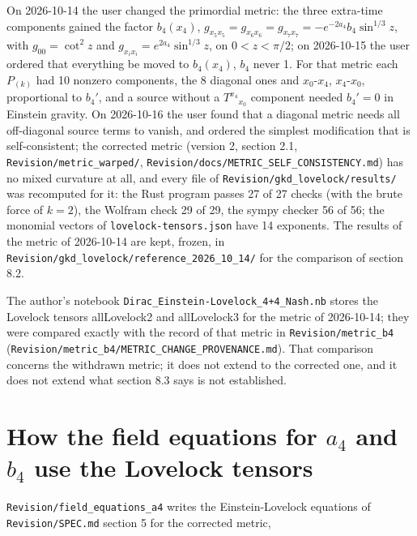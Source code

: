 \documentclass[11pt]{article}
\begin{document}
On 2026-10-14 the user changed the primordial metric: the three extra-time components gained the factor $b_4(x_4)$, $g_{x_5x_5} = g_{x_6x_6} = g_{x_7x_7} = -e^{-2a_4}b_4\sin^{1/3}z$, with $g_{00} = \cot^2z$ and $g_{x_ix_i} = e^{2a_4}\sin^{1/3}z$, on $0 < z < \pi/2$; on 2026-10-15 the user ordered that everything be moved to $b_4(x_4)$, $b_4$ never 1. For that metric each $P_{(k)}$ had 10 nonzero components, the 8 diagonal ones and $x_0$-$x_4$, $x_4$-$x_0$, proportional to $b_4'$, and a source without a $T^{x_4}{}_{x_0}$ component needed $b_4' = 0$ in Einstein gravity. On 2026-10-16 the user found that a diagonal metric needs all off-diagonal source terms to vanish, and ordered the simplest modification that is self-consistent; the corrected metric (version 2, section 2.1, \texttt{Revision\allowbreak{}/metric\_\allowbreak{}warped/}, \texttt{Revision\allowbreak{}/docs/ME\allowbreak{}TRIC\_SEL\allowbreak{}F\_CONSIS\allowbreak{}TENCY.md}) has no mixed curvature at all, and every file of \texttt{Revision\allowbreak{}/gkd\_lov\allowbreak{}elock/re\allowbreak{}sults/} was recomputed for it: the Rust program passes 27 of 27 checks (with the brute force of $k = 2$), the Wolfram check 29 of 29, the sympy checker 56 of 56; the monomial vectors of \texttt{lovelock\allowbreak{}-tensors\allowbreak{}.json} have 14 exponents. The results of the metric of 2026-10-14 are kept, frozen, in \texttt{Revision\allowbreak{}/gkd\_lov\allowbreak{}elock/re\allowbreak{}ference\_\allowbreak{}2026\_10\_\allowbreak{}14/} for the comparison of section 8.2.

The author's notebook \texttt{Dirac\_Ei\allowbreak{}nstein-L\allowbreak{}ovelock\_\allowbreak{}4+4\_Nash\allowbreak{}.nb} stores the Lovelock tensors allLovelock2 and allLovelock3 for the metric of 2026-10-14; they were compared exactly with the record of that metric in \texttt{Revision\allowbreak{}/metric\_\allowbreak{}b4} (\texttt{Revision\allowbreak{}/metric\_\allowbreak{}b4/METRI\allowbreak{}C\_CHANGE\allowbreak{}\_PROVENA\allowbreak{}NCE.md}). That comparison concerns the withdrawn metric; it does not extend to the corrected one, and it does not extend what section 8.3 says is not established.

\section{How the field equations for \texorpdfstring{$a_4$}{a\_4} and \texorpdfstring{$b_4$}{b\_4} use the Lovelock tensors}

\texttt{Revision\allowbreak{}/field\_e\allowbreak{}quations\allowbreak{}\_a4} writes the Einstein-Lovelock equations of \texttt{Revision\allowbreak{}/SPEC.md} section 5 for the corrected metric,
\end{document}

